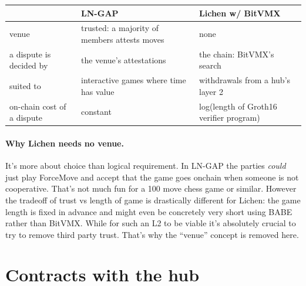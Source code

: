 \documentclass[11pt]{article}
\begin{document}
\begin{center}
\small
\begin{tabularx}{\linewidth}{p{24mm}LL}
\toprule
& LN-GAP &  Lichen w/ BitVMX  \\
\midrule
venue & trusted: a majority of members attests moves & none \\
a dispute is decided by & the venue's attestations  & the chain: BitVMX's search \\
suited to & interactive games where time has value  & withdrawals from a hub's layer 2 \\
on-chain cost of a dispute & constant & log(length of Groth16 verifier program) \\
\bottomrule
\end{tabularx}
\end{center}

\paragraph{Why Lichen needs no venue.}  It's more about choice than logical requirement. In LN-GAP the parties \emph{could} just play ForceMove and accept that the game goes onchain when someone is not cooperative. That's not much fun for a 100 move chess game or similar. However the tradeoff of trust vs length of game is drastically different for Lichen: the game length is fixed in advance and might even be concretely very short using BABE rather than BitVMX. While for such an L2 to be viable it's absolutely crucial to try to remove third party trust. That's why the ``venue'' concept is removed here.

\section{Contracts with the hub}
\label{sec:terms}
\end{document}
